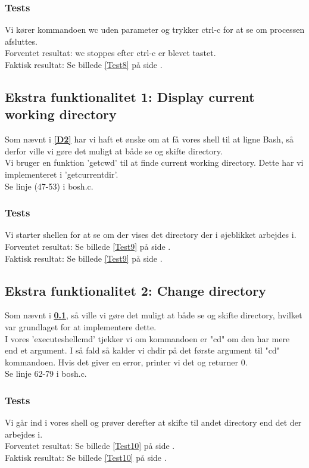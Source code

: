 \subsubsection{Tests}
Vi kører kommandoen wc uden parameter og trykker ctrl-c for at se om processen afsluttes.
\\Forventet resultat: wc stoppes efter ctrl-c er blevet tastet.
\\Faktisk resultat: Se billede \ref{Test8} på side \pageref{Test8}.

\subsection{Ekstra funktionalitet 1: Display current working directory}
\label{E1}
Som nævnt i \textbf{\ref{D2}} har vi haft et ønske om at få vores shell til at ligne Bash, så derfor ville vi gøre det muligt at både se og skifte directory.
\\Vi bruger en funktion 'getcwd' til at finde current working directory. Dette har vi implementeret i 'getcurrentdir'.
\\Se linje (47-53) i bosh.c.
\subsubsection{Tests}
Vi starter shellen for at se om der vises det directory der i øjeblikket arbejdes i.
\\Forventet resultat: Se billede \ref{Test9} på side \pageref{Test9}.
\\Faktisk resultat: Se billede \ref{Test9} på side \pageref{Test9}.

\subsection{Ekstra funktionalitet 2: Change directory}
\label{E2}
Som nævnt i \textbf{\ref{E1}}, så ville vi gøre det muligt at både se og skifte directory, hvilket var grundlaget for at implementere dette.
\\I vores 'executeshellcmd' tjekker vi om kommandoen er "cd" om den har mere end et argument. I så fald så kalder vi chdir på det første argument til "cd" kommandoen. Hvis det giver en error, printer vi det og returner 0.
\\Se linje 62-79 i bosh.c.
\subsubsection{Tests}
Vi går ind i vores shell og prøver derefter at skifte til andet directory end det der arbejdes i.
\\Forventet resultat: Se billede \ref{Test10} på side \pageref{Test10}.
\\Faktisk resultat: Se billede \ref{Test10} på side \pageref{Test10}.